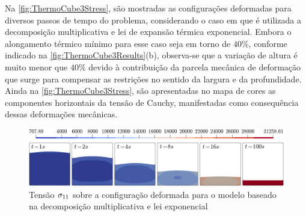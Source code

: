 \documentclass[Tese.tex]{subfiles}
\begin{document}
Na \autoref{fig:ThermoCube3Stress}, são mostradas as configurações deformadas para diversos passos de tempo do problema, considerando o caso em que é utilizada a decomposição multiplicativa e lei de expansão térmica exponencial. Embora o alongamento térmico mínimo para esse caso seja em torno de $40\%$, conforme indicado na \autoref{fig:ThermoCube3Results}(b), observa-se que a variação de altura é muito menor que $40\%$ devido à contribuição da parcela mecânica de deformação que surge para compensar as restrições no sentido da largura e da profundidade. Ainda na \autoref{fig:ThermoCube3Stress}, são apresentadas no mapa de cores as componentes horizontais da tensão de Cauchy, manifestadas como consequência dessas deformações mecânicas.
\begin{figure}[!htb]
	\centering
	\caption{Tensão ${\sigma}_{11}$ sobre a configuração deformada para o modelo baseado na decomposição multiplicativa e lei exponencial}
	\label{fig:ThermoCube3Stress}
	\includegraphics[scale=0.44]{Figuras/ThermoCube3/ThermoCube3Stress.png}
\end{figure}

\end{document}
